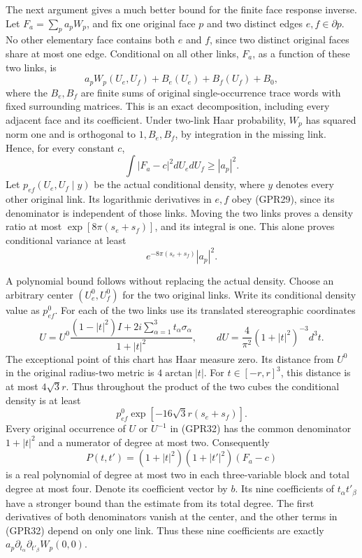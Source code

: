 \documentclass[11pt]{article}
\begin{document}
The next argument gives a much better bound for the finite face response inverse. Let \(F_a=\sum_pa_pW_p\), and fix one original face \(p\) and two distinct edges \(e,f\in\partial p\). No other elementary face contains both \(e\) and \(f\), since two distinct original faces share at most one edge. Conditional on all other links, \(F_a\), as a function of these two links, is
\[
 a_pW_p(U_e,U_f)+B_e(U_e)+B_f(U_f)+B_0,
 \tag{GPR32}
\]
where the \(B_e,B_f\) are finite sums of original single-occurrence trace words with fixed surrounding matrices. This is an exact decomposition, including every adjacent face and its coefficient. Under two-link Haar probability, \(W_p\) has squared norm one and is orthogonal to \(1,B_e,B_f\), by integration in the missing link. Hence, for every constant \(c\),
\[
 \int|F_a-c|^2dU_edU_f\ge |a_p|^2.
 \tag{GPR33}
\]
Let \(p_{ef}(U_e,U_f\mid y)\) be the actual conditional density, where \(y\) denotes every other original link. Its logarithmic derivatives in \(e,f\) obey (GPR29), since its denominator is independent of those links. Moving the two links proves a density ratio at most \(\exp[8\pi(s_e+s_f)]\), and its integral is one. This alone proves conditional variance at least
\[
 e^{-8\pi(s_e+s_f)}|a_p|^2.
 \tag{GPR34}
\]

A polynomial bound follows without replacing the actual density. Choose an arbitrary center \((U_e^0,U_f^0)\) for the two original links. Write its conditional density value as \(p_{ef}^0\). For each of the two links use its translated stereographic coordinates
\[
 U=U^0\frac{(1-|t|^2)I+2i\sum_{\alpha=1}^3t_\alpha\sigma_\alpha}{1+|t|^2},\qquad
 dU=\frac4{\pi^2}(1+|t|^2)^{-3}d^3t.
 \tag{GPR35}
\]
The exceptional point of this chart has Haar measure zero. Its distance from \(U^0\) in the original radius-two metric is \(4\arctan|t|\). For \(t\in[-r,r]^3\), this distance is at most \(4\sqrt3r\). Thus throughout the product of the two cubes the conditional density is at least
\[
 p_{ef}^0\exp[-16\sqrt3r(s_e+s_f)].
 \tag{GPR36}
\]
Every original occurrence of \(U\) or \(U^{-1}\) in (GPR32) has the common denominator \(1+|t|^2\) and a numerator of degree at most two. Consequently
\[
 P(t,t')=(1+|t|^2)(1+|t'|^2)(F_a-c)
 \tag{GPR37}
\]
is a real polynomial of degree at most two in each three-variable block and total degree at most four. Denote its coefficient vector by \(b\). Its nine coefficients of \(t_\alpha t'_\beta\) have a stronger bound than the estimate from its total degree. The first derivatives of both denominators vanish at the center, and the other terms in (GPR32) depend on only one link. Thus these nine coefficients are exactly \(a_p\partial_{t_\alpha}\partial_{t'_\beta}W_p(0,0)\).
\end{document}
